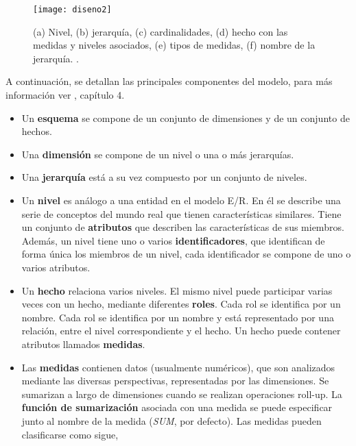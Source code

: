 \documentclass[a4paper,11pt]{article}
\begin{document}
      \begin{figure}[h]
        \begin{center}
          \texttt{[image: diseno2]}
          \caption{(a) Nivel, (b) jerarquía, (c) cardinalidades, (d) hecho con las medidas y niveles asociados, (e) tipos de medidas, (f) nombre de la jerarquía.
          \cite[p.~91]{VaismanZimanyi14}.}
          \label{disenoNotaciones}
        \end{center}
      \end{figure}
      
      A continuación, se detallan las principales componentes del modelo, para más información ver \cite{VaismanZimanyi14}, capítulo 4.
      
      \begin{itemize}
        \item Un \textbf{esquema} se compone de un conjunto de dimensiones y de un conjunto de hechos.
        \item Una \textbf{dimensión} se compone de un nivel o una o más jerarquías.
        \item Una \textbf{jerarquía} está a su vez compuesto por un conjunto de niveles. 
        \item Un \textbf{nivel} es análogo a una entidad en el modelo E/R. En él se describe una serie de conceptos del mundo real que tienen
        características similares. Tiene un conjunto de \textbf{atributos} que describen las características de sus miembros. Además, un nivel tiene uno o
        varios \textbf{identificadores}, que identifican de forma única los miembros de un nivel, cada identificador se compone de uno o varios atributos.
        \item Un \textbf{hecho} relaciona varios niveles. El mismo nivel puede participar varias veces con un hecho, mediante diferentes \textbf{roles}.
        Cada rol se identifica por un nombre. Cada rol se identifica por un nombre y está representado por una relación, entre el nivel correspondiente y el hecho.
        Un hecho puede contener atributos llamados \textbf{medidas}.
        \item Las \textbf{medidas} contienen datos (usualmente numéricos), que son analizados mediante las diversas perspectivas, representadas por las dimensiones.
        Se sumarizan a largo de dimensiones cuando se realizan operaciones roll-up. La \textbf{función de sumarización} asociada
        con una medida se puede especificar junto al nombre de la medida (\textit{SUM}, por defecto). Las medidas pueden clasificarse como sigue,

\end{itemize}
\end{document}
